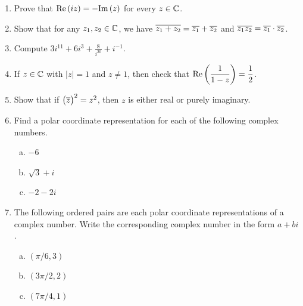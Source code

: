 \documentclass[11pt,fleqn,dvipsnames,usenames]{article}
\begin{document}
\begin{enumerate}
\item Prove that $\text{Re}\left(iz\right) = -\text{Im}\left(z\right)$ for every $z\in\mathbb{C}$.
\item Show that for any $z_{1},z_{2}\in\mathbb{C}$, we have $\overline{z_{1} + z_{2}} = \overline{z_{1}} + \overline{z_{2}}$ and $\overline{z_{1}z_{2}} = \overline{z_{1}}\cdot\overline{z_{2}}$.
\item Compute $3i^{11} + 6i^{3} + \frac{8}{i^{20}} + i^{-1}$.
\item If $z\in\mathbb{C}$ with $|z| = 1$ and $z\neq 1$, then check that $\text{Re}\left(\dfrac{1}{1-z}\right) = \dfrac{1}{2}$.
\item Show that if $\big(\overline{z}\big)^2 = z^2$, then $z$ is either real or purely imaginary.
\item Find a polar coordinate representation for each of the following complex numbers.
\begin{multicols}{3}
\begin{enumerate}[(a)]
\item $-6$
\item $\sqrt{3} + i$
\item $-2-2i$
\end{enumerate}
\end{multicols}
\item The following ordered pairs are each polar coordinate representations of a complex number.  Write the corresponding complex number in the form $a + bi$.
\begin{multicols}{3}
\begin{enumerate}[(a)]
\item $(\pi/6,3)$
\item $(3\pi/2,2)$
\item $(7\pi/4,1)$
\end{enumerate}

\end{multicols}
\end{enumerate}
\end{document}
